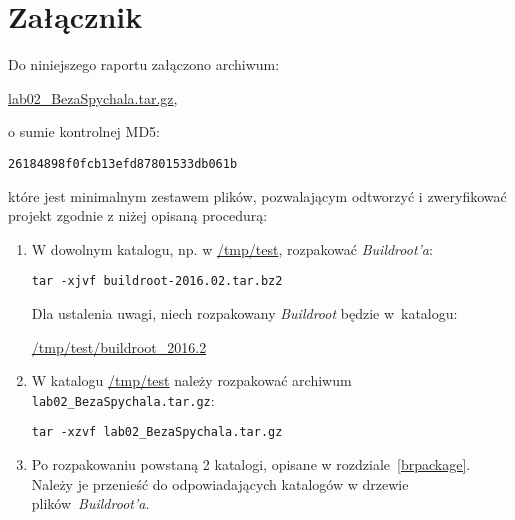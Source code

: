 \documentclass{article}
\newcommand{\labnumber}{2}
\begin{document}

\section{Załącznik}

Do niniejszego raportu załączono archiwum:
\begin{center}
\url{lab0\labnumber\_BezaSpychala.tar.gz},
\end{center}
o sumie kontrolnej MD5:
\begin{center}
\texttt{26184898f0fcb13efd87801533db061b}
\end{center}
które jest minimalnym zestawem plików, pozwalającym odtworzyć i zweryfikować projekt zgodnie z niżej opisaną procedurą:
\begin{enumerate}
\item W dowolnym katalogu, np. w \url{/tmp/test}, rozpakować \emph{Buildroot'a}:
\begin{center}
\texttt{tar -xjvf buildroot-2016.02.tar.bz2}
\end{center}

Dla ustalenia uwagi, niech rozpakowany \emph{Buildroot} będzie w~katalogu:
\begin{center}
\url{/tmp/test/buildroot\_2016.2}
\end{center}

\item W katalogu \url{/tmp/test} należy rozpakować archiwum \texttt{lab0\labnumber\_BezaSpychala.tar.gz}:
\begin{center}
\texttt{tar -xzvf lab0\labnumber\_BezaSpychala.tar.gz}
\end{center}

\item Po rozpakowaniu powstaną 2 katalogi, opisane w rozdziale~\ref{brpackage}. Należy je przenieść do odpowiadających katalogów w drzewie plików~\emph{Buildroot'a}.
\end{enumerate}




\end{document}
